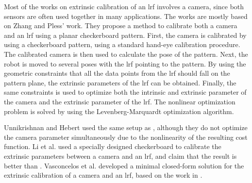 Most of the works on extrinsic calibration of an \ac{lrf} involves a camera, since both sensors are often used together in many applications. The works are mostly based on Zhang and Pless' work\cite{Zhang2004}. They propose a method to calibrate both a camera and an \ac{lrf} using a planar checkerboard pattern. First, the camera is calibrated by using a checkerboard pattern, using a standard hand-eye calibration procedure. The calibrated camera is then used to calculate the pose of the pattern. Next, the robot is moved to several poses with the \ac{lrf} pointing to the pattern. By using the geometric constraints that all the data points from the \ac{lrf} should fall on the pattern plane, the extrinsic parameters of the \ac{lrf} can be obtained. Finally, the same constraints is used to optimize both the intrinsic and extrinsic parameter of the camera and the extrinsic parameter of the \ac{lrf}. The nonlinear optimization problem is solved by using the Levenberg-Marquardt optimization algorithm.

Unnikrishnan and Hebert \cite{Unnikrishnan2005} used the same setup as \cite{Zhang2004}, although they do not optimize the camera parameter simultaneously due to the nonlinearity of the resulting cost function. 
Li et al. \cite{Li2007} used a specially designed checkerboard to calibrate the extrinsic parameters between a camera and an \ac{lrf}, and claim that the result is better than \cite{Zhang2004}. Vasconcelos et al. \cite{Vasconcelos2012} developed a minimal closed-form solution for the extrinsic calibration of a camera and an \ac{lrf}, based on the work in \cite{Zhang2004}. 


